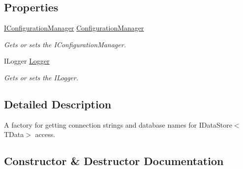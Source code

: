 \subsection*{Properties}
\begin{DoxyCompactItemize}
\item 
\hyperlink{interfaceCqrs_1_1Configuration_1_1IConfigurationManager}{I\+Configuration\+Manager} \hyperlink{classCqrs_1_1MongoDB_1_1Factories_1_1MongoDbDataStoreConnectionStringFactory_af39bf5809bdffc1499a995ac1769831a_af39bf5809bdffc1499a995ac1769831a}{Configuration\+Manager}
\begin{DoxyCompactList}\small\item\em Gets or sets the I\+Configuration\+Manager. \end{DoxyCompactList}\item 
I\+Logger \hyperlink{classCqrs_1_1MongoDB_1_1Factories_1_1MongoDbDataStoreConnectionStringFactory_ab2ebea030cc01719042d338712224f50_ab2ebea030cc01719042d338712224f50}{Logger}
\begin{DoxyCompactList}\small\item\em Gets or sets the I\+Logger. \end{DoxyCompactList}\end{DoxyCompactItemize}


\subsection{Detailed Description}
A factory for getting connection strings and database names for I\+Data\+Store$<$\+T\+Data$>$ access. 



\subsection{Constructor \& Destructor Documentation}
\mbox{\label{classCqrs_1_1MongoDB_1_1Factories_1_1MongoDbDataStoreConnectionStringFactory_a9ccb753772ee1aa374ad39ba5b93700f_a9ccb753772ee1aa374ad39ba5b93700f}} 
